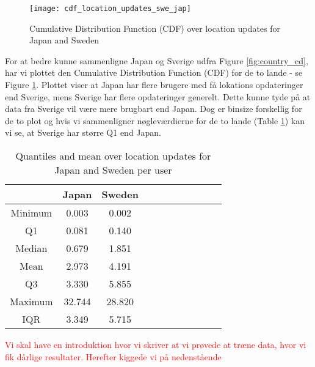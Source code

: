 \begin{figure}[H]
    \centering
    \texttt{[image: cdf\_location\_updates\_swe\_jap]}
    \caption{Cumulative Distribution Function (CDF) over location updates for Japan and Sweden}
    \label{fig:country_cdf}
\end{figure}

For at bedre kunne sammenligne Japan og Sverige udfra Figure \ref{fig:country_cd}, har vi plottet den Cumulative Distribution Function (CDF) for de to lande - se Figure \ref{fig:country_cdf}. Plottet viser at Japan har flere brugere med få lokations opdateringer end Sverige, mens Sverige har flere opdateringer generelt. Dette kunne tyde på at data fra  Sverige vil være mere brugbart end Japan. Dog er binsize forskellig for de to plot og hvis vi sammenligner nøgleværdierne for de to lande (Table \ref{tab:stat_loc_updates}) kan vi se, at Sverige har større Q1 end Japan.

\begin{table}[htbp]
        \centering
        \small
        \setlength\tabcolsep{2pt}
        \begin{tabular}{|c|c|c|c|c|c|c|c|c|c|c|}
            \hline
                         & Japan      &   Sweden      \\[-3pt]
            \hline
                 Minimum &    0.003       &   0.002          \\
            \hline
                 Q1      &  0.081     &   0.140      \\
            \hline
                 Median  & 0.679     &   1.851      \\
            \hline
                 Mean    &  2.973   &  4.191     \\
            \hline
                 Q3      & 3.330    &   5.855     \\
            \hline
                 Maximum &  32.744 &  28.820     \\
            \hline
                 IQR     &  3.349   &  5.715      \\
            \hline
            
        \end{tabular}
        \caption{Quantiles and mean over location updates for Japan and Sweden per user} %
        \label{tab:stat_loc_updates}
\end{table}

\textcolor{red}{Vi skal have en introduktion hvor vi skriver at vi prøvede at træne data, hvor vi fik dårlige resultater. Herefter kiggede vi på nedenstående}

